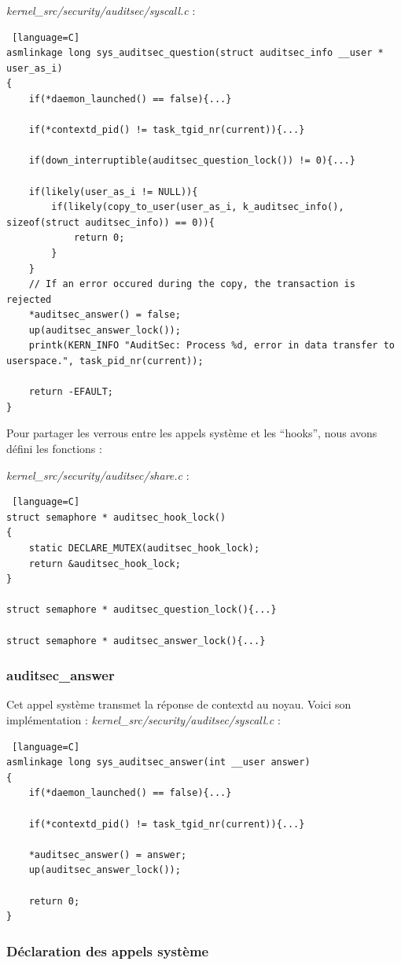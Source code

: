 \documentclass[pdftex,a4paper,titlepage,11pt]{article}
\begin{document}
\textit{{kernel\_src}/security/auditsec/syscall.c} :
\begin{lstlisting} [language=C]
asmlinkage long sys_auditsec_question(struct auditsec_info __user * user_as_i)
{
	if(*daemon_launched() == false){...}

	if(*contextd_pid() != task_tgid_nr(current)){...}

	if(down_interruptible(auditsec_question_lock()) != 0){...}

	if(likely(user_as_i != NULL)){
		if(likely(copy_to_user(user_as_i, k_auditsec_info(), sizeof(struct auditsec_info)) == 0)){
			return 0;
		}
	}
	// If an error occured during the copy, the transaction is rejected
	*auditsec_answer() = false;
	up(auditsec_answer_lock());
	printk(KERN_INFO "AuditSec: Process %d, error in data transfer to userspace.", task_pid_nr(current));

	return -EFAULT;
}
\end{lstlisting}

Pour partager les verrous entre les appels système et les ``hooks'', nous avons défini les fonctions :

\textit{{kernel\_src}/security/auditsec/share.c} :
\begin{lstlisting} [language=C]
struct semaphore * auditsec_hook_lock()
{
	static DECLARE_MUTEX(auditsec_hook_lock);
	return &auditsec_hook_lock;
}

struct semaphore * auditsec_question_lock(){...}

struct semaphore * auditsec_answer_lock(){...}
\end{lstlisting}

\subsubsection{auditsec\_answer}

Cet appel système transmet la réponse de contextd au noyau. Voici son implémentation :
\textit{{kernel\_src}/security/auditsec/syscall.c} :
\begin{lstlisting} [language=C]
asmlinkage long sys_auditsec_answer(int __user answer)
{
	if(*daemon_launched() == false){...}

	if(*contextd_pid() != task_tgid_nr(current)){...}

	*auditsec_answer() = answer;
	up(auditsec_answer_lock());

	return 0;
}
\end{lstlisting}

\subsubsection{Déclaration des appels système}
\end{document}
